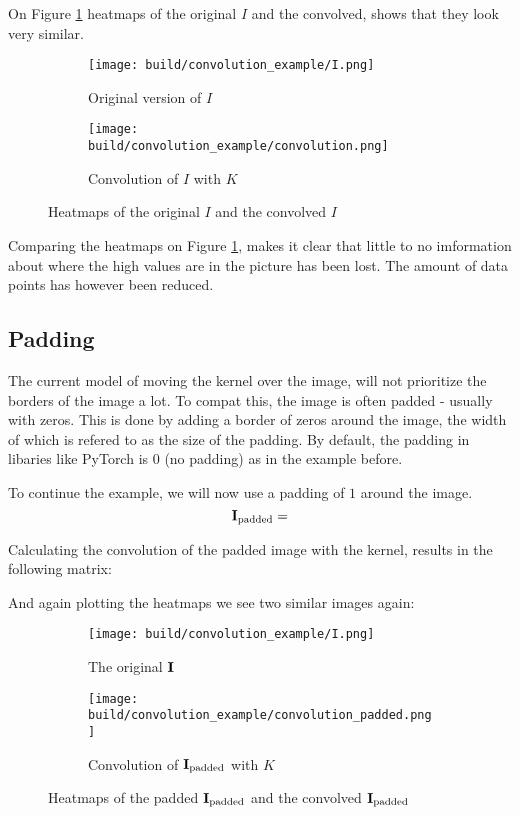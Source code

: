 On Figure \ref{fig:convolution_example} heatmaps of the original $I$ and the convolved, shows that they look very similar.
\begin{figure}[h]
    \centering
    \begin{subfigure}{0.45\textwidth}
        \texttt{[image: build/convolution\_example/I.png]}
        \caption{Original version of $I$}
    \end{subfigure}
    \begin{subfigure}{0.45\textwidth}
        \texttt{[image: build/convolution\_example/convolution.png]}
        \caption{Convolution of $I$ with $K$}
    \end{subfigure}
    \caption{Heatmaps of the original $I$ and the convolved $I$}
    \label{fig:convolution_example}
\end{figure}

Comparing the heatmaps on Figure \ref{fig:convolution_example}, makes it clear that little to no imformation about
where the high values are in the picture has been lost.
The amount of data points has however been reduced.

\subsection{Padding}
The current model of moving the kernel over the image, will not prioritize the borders
of the image a lot.
To compat this, the image is often padded - usually with zeros.
This is done by adding a border of zeros around the image, the width of which is refered to as the size of the padding.
By default, the padding in libaries like PyTorch \cite{PyTorch} is $0$ (no padding) as in the example before.

To continue the example, we will now use a padding of $1$ around the image.
\begin{equation}
    \textbf{I}_{\text{padded}} = 
\end{equation}

Calculating the convolution of the padded image with the kernel, results in the following matrix:
\begin{equation}
    
\end{equation}

And again plotting the heatmaps we see two similar images again:
\begin{figure}[h]
    \centering
    \begin{subfigure}{0.45\textwidth}
        \texttt{[image: build/convolution\_example/I.png]}
        \caption{The original $\textbf{I}$}
    \end{subfigure}
    \begin{subfigure}{0.45\textwidth}
        \texttt{[image: build/convolution\_example/convolution\_padded.png]}
        \caption{Convolution of $\textbf{I}_{\text{padded}}$ with $K$}
    \end{subfigure}
    \caption{Heatmaps of the padded $\textbf{I}_{\text{padded}}$ and the convolved $\textbf{I}_{\text{padded}}$}
    \label{fig:convolution_example_padded}
\end{figure}


